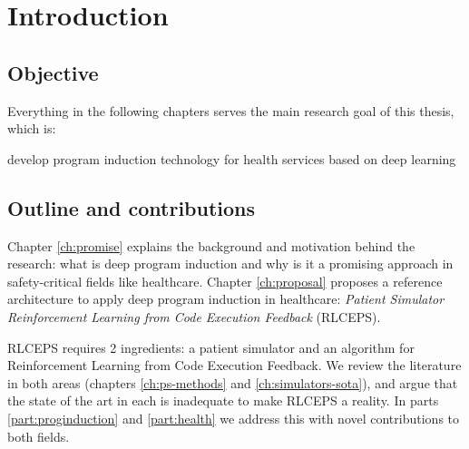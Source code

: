\chapter{Introduction}
\label{ch:preface}

\section{Objective}
\label{sec:objective}

Everything in the following chapters serves the main research goal of this thesis, which is:

\begin{highlight}
    develop program induction technology for health services based on deep learning
\end{highlight}

\section{Outline and contributions}

Chapter \ref{ch:promise} explains the background and motivation behind the research: what is deep program induction and why is it a promising approach in safety-critical fields like healthcare. Chapter \ref{ch:proposal} proposes a reference architecture to apply deep program induction in healthcare: \emph{Patient Simulator Reinforcement Learning from Code Execution Feedback} (RLCEPS).

RLCEPS requires 2 ingredients: a patient simulator and an algorithm for Reinforcement Learning from Code Execution Feedback.
We review the literature in both areas (chapters \ref{ch:ps-methods} and \ref{ch:simulators-sota}), and argue that the state of the art in each is inadequate to make RLCEPS a reality.
In parts \ref{part:proginduction} and \ref{part:health} we address this with novel contributions to both fields.

